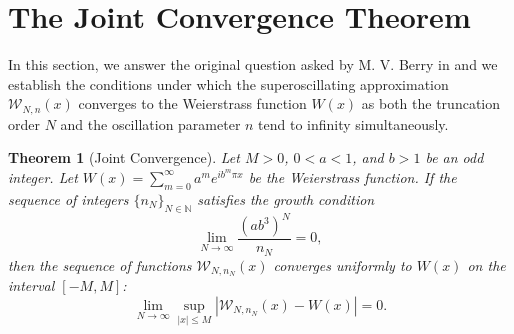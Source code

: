 \documentclass[reqno,11pt]{amsart}
\newtheorem{theorem}{Theorem}[section]
\theoremstyle{definition}
\begin{document}
\section{The Joint Convergence Theorem}\label{SEC4}

In this section, we answer the original question asked by M. V. Berry in \cite{berry2016fractals} and we establish the conditions under which the superoscillating approximation $\mathcal{W}_{N, n}(x)$ converges to the Weierstrass function $W(x)$ as both the truncation order $N$ and the oscillation parameter $n$ tend to infinity simultaneously.

\begin{theorem}[Joint Convergence]
Let $M > 0$, $0 < a < 1$, and $b > 1$ be an odd integer. Let $W(x) = \sum_{m=0}^{\infty} a^m e^{i b^m \pi x}$ be the Weierstrass function. If the sequence of integers $\{n_N\}_{N \in \mathbb{N}}$ satisfies the growth condition
\begin{equation} \label{eq:growth_condition}
    \lim_{N \to \infty} \frac{(ab^3)^N}{n_N} = 0,
\end{equation}
then the sequence of functions $\mathcal{W}_{N, n_N}(x)$ converges uniformly to $W(x)$ on the interval $[-M, M]$:
\begin{equation}
    \lim_{N \to \infty} \sup_{|x| \le M} \left| \mathcal{W}_{N, n_N}(x) - W(x) \right| = 0.
\end{equation}
\end{theorem}
\end{document}
